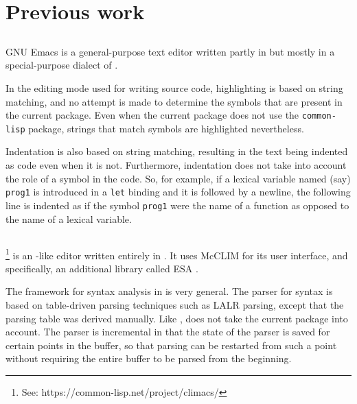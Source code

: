 \section{Previous work}

\subsection{\emacs{}}
\label{sec-previous-emacs}

GNU Emacs \cite{Finseth:1980:TPTa,CraftOfTextEditiing} is a
general-purpose text editor written partly in \clanguage{} but mostly
in a special-purpose dialect of \lisp{}
\cite{GNUEmacsLispReferenceManual}.

In the editing mode used for writing \commonlisp{} source code,
highlighting is based on string matching, and no attempt is made to
determine the symbols that are present in the current package.  Even
when the current package does not use the \texttt{common-lisp}
package, strings that match \commonlisp{} symbols are highlighted
nevertheless.

Indentation is also based on string matching, resulting in the text
being indented as \commonlisp{} code even when it is not.
Furthermore, indentation does not take into account the role of a
symbol in the code.  So, for example, if a lexical variable named
(say) \texttt{prog1} is introduced in a \texttt{let} binding and
it is followed by a newline, the following line is indented as if the
symbol \texttt{prog1} were the name of a \commonlisp{} function as
opposed to the name of a lexical variable.

\subsection{\climacs{}}

\climacs%
\footnote{See: https://common-lisp.net/project/climacs/}
is an \emacs{}-like editor written entirely in \commonlisp{}.  It uses
McCLIM \cite{Strandh:2002:ILC:McCLIM}
for its user interface, and specifically, an additional library called
ESA \cite{Strandh:2007:ECL:1622123.1622150}.

The framework for syntax analysis in \climacs{}
\cite{Rhodes.etal:2005} is very general.  The parser for \commonlisp{}
syntax is based on table-driven parsing techniques such as LALR
parsing, except that the parsing table was derived manually.  Like
\emacs{}, \climacs{} does not take the current package into account.
The parser is incremental in that the state of the parser is saved for
certain points in the buffer, so that parsing can be restarted from
such a point without requiring the entire buffer to be parsed from the
beginning.

